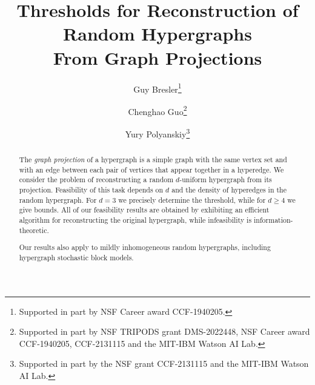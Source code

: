 \documentclass{article}
\title{Thresholds for Reconstruction of Random Hypergraphs \\ From Graph Projections}
\author{Guy Bresler\thanks{Supported in part by NSF Career award CCF-1940205.}
\and Chenghao Guo\thanks{Supported in part by NSF TRIPODS grant DMS-2022448, NSF Career award CCF-1940205, CCF-2131115 and the MIT-IBM Watson AI Lab.} \and Yury Polyanskiy\thanks{Supported in part by the NSF grant CCF-2131115 and the MIT-IBM Watson AI Lab.}}
\date{}
\begin{document}
\maketitle

\begin{abstract}
The \emph{graph projection} of a hypergraph is a simple graph with the same vertex set and with an edge between each pair of vertices that appear together in a hyperedge.  
We consider the problem of reconstructing a random $d$-uniform hypergraph from its projection. Feasibility of this task depends on $d$ and the density of hyperedges in the random hypergraph. For $d=3$ we precisely determine the threshold, while for $d\geq 4$ we give bounds. All of our feasibility results are obtained by exhibiting an efficient algorithm for reconstructing the original hypergraph, while infeasibility is information-theoretic. 

Our results also apply to mildly inhomogeneous random hypergraphs, including hypergraph stochastic block models. 


\end{abstract}



% 



% 



% 







% 



\appendix





\end{document}

